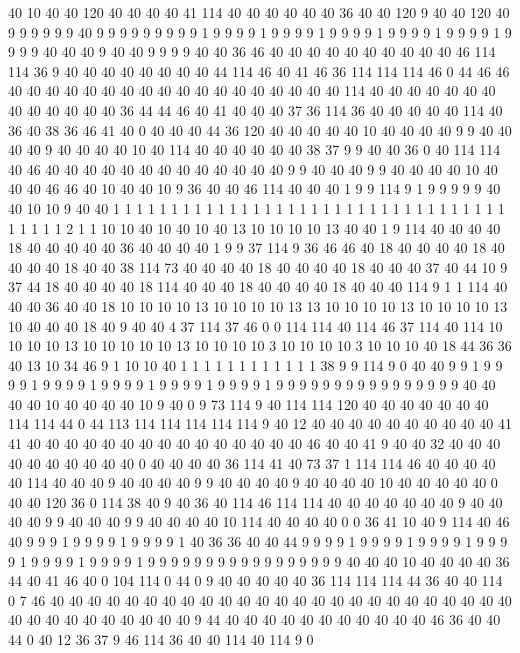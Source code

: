 40 10 40 40 120 40 40 40 40 41 114 40 40 40 40 40 40 36 40 40
120 9 40 40 120 40 9 9 9 9 9 9 40 9 9 9 9 9 9 9
9 9 1 9 9 9 9 1 9 9 9 9 1 9 9 9 9 1 9 9
9 9 1 9 9 9 9 1 9 9 9 9 40 40 40 9 40 40 9 9
9 9 40 40 36 46 40 40 40 40 40 40 40 40 40 40 46 114 114 36
9 40 40 40 40 40 40 40 40 44 114 46 40 41 46 36 114 114 114 46
0 44 46 46 40 40 40 40 40 40 40 40 40 40 40 40 40 40 40 40
40 40 114 40 40 40 40 40 40 40 40 40 40 40 40 40 36 44 44 46
40 41 40 40 40 37 36 114 36 40 40 40 40 40 114 40 36 40 38 36
46 41 40 0 40 40 40 44 36 120 40 40 40 40 40 10 40 40 40 40
9 9 40 40 40 40 9 40 40 40 40 10 40 114 40 40 40 40 40 40
38 37 9 9 40 40 36 0 40 114 114 40 46 40 40 40 40 40 40 40
40 40 40 40 40 40 9 9 40 40 40 9 9 40 40 40 40 10 40 40
40 46 46 40 10 40 40 10 9 36 40 40 46 114 40 40 40 1 9 9
114 9 1 9 9 9 9 9 40 40 10 10 9 40 40 1 1 1 1 1
1 1 1 1 1 1 1 1 1 1 1 1 1 1 1 1 1 1 1 1
1 1 1 1 1 1 1 1 1 1 1 1 1 1 2 1 1 10 10 40
10 40 10 40 13 10 10 10 10 13 40 40 1 9 114 40 40 40 40 18
40 40 40 40 40 36 40 40 40 40 1 9 9 37 114 9 36 46 46 40
18 40 40 40 40 18 40 40 40 40 18 40 40 38 114 73 40 40 40 40
18 40 40 40 40 18 40 40 40 37 40 44 10 9 37 44 18 40 40 40
40 18 114 40 40 40 18 40 40 40 40 18 40 40 40 114 9 1 1 114
40 40 40 36 40 40 18 10 10 10 10 13 10 10 10 10 13 13 10 10
10 10 13 10 10 10 10 13 10 40 40 40 18 40 9 40 40 4 37 114
37 46 0 0 114 114 40 114 46 37 114 40 114 10 10 10 10 13 10 10
10 10 10 13 10 10 10 10 3 10 10 10 10 3 10 10 10 40 18 44
36 36 40 13 10 34 46 9 1 10 10 40 1 1 1 1 1 1 1 1
1 1 1 1 38 9 9 114 9 0 40 40 9 9 1 9 9 9 9 1
9 9 9 9 1 9 9 9 9 1 9 9 9 9 1 9 9 9 9 1
9 9 9 9 9 9 9 9 9 9 9 9 9 9 9 9 40 40 40 40
10 40 40 40 40 10 9 40 0 9 73 114 9 40 114 114 120 40 40 40
40 40 40 40 114 114 44 0 44 113 114 114 114 114 114 9 40 12 40 40
40 40 40 40 40 40 40 40 41 41 40 40 40 40 40 40 40 40 40 40
40 40 40 40 40 46 40 40 41 9 40 40 32 40 40 40 40 40 40 40
40 40 40 0 40 40 40 40 36 114 41 40 73 37 1 114 114 46 40 40
40 40 40 114 40 40 40 9 40 40 40 40 9 9 40 40 40 40 9 40
40 40 40 10 40 40 40 40 40 0 40 40 120 36 0 114 38 40 9 40
36 40 114 46 114 114 40 40 40 40 40 40 40 9 40 40 40 40 9 9
40 40 40 9 9 40 40 40 40 10 114 40 40 40 40 0 0 36 41 10
40 9 114 40 46 40 9 9 9 1 9 9 9 9 1 9 9 9 9 1
40 36 36 40 40 44 9 9 9 9 1 9 9 9 9 1 9 9 9 9
1 9 9 9 9 1 9 9 9 9 1 9 9 9 9 1 9 9 9 9
9 9 9 9 9 9 9 9 9 9 9 9 9 40 40 40 10 40 40 40
40 36 44 40 41 46 40 0 104 114 0 44 0 9 40 40 40 40 40 36
114 114 114 44 36 40 40 114 0 7 46 40 40 40 40 40 40 40 40 40
40 40 40 40 40 40 40 40 40 40 40 40 40 40 40 40 40 40 40 40
40 40 40 40 40 40 9 44 40 40 40 40 40 40 40 40 40 40 40 46
36 40 40 44 0 40 12 36 37 9 46 114 36 40 40 114 40 114 9 0
